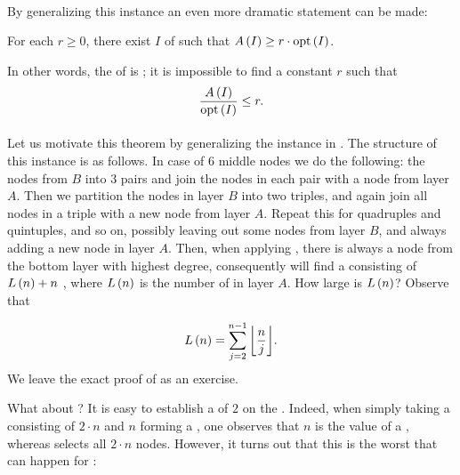 
\paragraph{}
By generalizing this instance an even more dramatic statement can be made:
\begin{theorem}
For each $r\geq 0$, there exist  $I$ of  such that $\fun{A}{I}\geq r\cdot\funm{opt}{I}$.
\end{theorem}
In other words, the  of  is ; it is impossible to find a constant $r$ such that
\begin{equation}
\displaystyle\frac{\fun{A}{I}}{\funm{opt}{I}}\leq r.
\end{equation}

\paragraph{}
Let us motivate this theorem by generalizing the instance in . The structure of this instance is as follows. In case of $6$ middle nodes we do the following:  the nodes from $B$ into $3$ pairs and join the nodes in each pair with a node from layer $A$. Then we partition the nodes in layer $B$ into two triples, and again join all nodes in a triple with a new node from layer $A$. Repeat this for quadruples and quintuples, and so on, possibly leaving out some nodes from layer $B$, and always adding a new node in layer $A$. Then, when applying , there is always a node from the bottom layer with highest degree, consequently  will find a  consisting of $\fun{L}{n}+n$ , where $\fun{L}{n}$ is the number of  in layer $A$. How large is $\fun{L}{n}$? Observe that

\begin{equation}
\fun{L}{n}=\sumieqb[j]{2}{n-1}{\floor{\displaystyle\frac{n}{j}}}.
\end{equation}
We leave the exact proof of  as an exercise.

What about ? It is easy to establish a  of $2$ on the . Indeed, when simply taking a  consisting of $2\cdot n$  and $n$  forming a , one observes that $n$ is the value of a , whereas  selects all $2\cdot n$ nodes. However, it turns out that this is the worst that can happen for :

